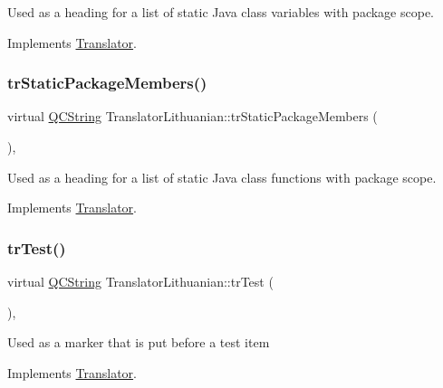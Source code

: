 Used as a heading for a list of static Java class variables with package scope. 

Implements \mbox{\hyperlink{class_translator}{Translator}}.

\mbox{\label{class_translator_lithuanian_ae675f44a1f3fa26421fdc69745eea950}} 
\subsubsection{\texorpdfstring{trStaticPackageMembers()}{trStaticPackageMembers()}}
{\footnotesize\ttfamily virtual \mbox{\hyperlink{class_q_c_string}{Q\+C\+String}} Translator\+Lithuanian\+::tr\+Static\+Package\+Members (\begin{DoxyParamCaption}{ }\end{DoxyParamCaption})\hspace{0.3cm}{\ttfamily [inline]}, {\ttfamily [virtual]}}

Used as a heading for a list of static Java class functions with package scope. 

Implements \mbox{\hyperlink{class_translator}{Translator}}.

\mbox{\label{class_translator_lithuanian_a4aedaa60971e8baffcbae5a48a36c8f0}} 
\subsubsection{\texorpdfstring{trTest()}{trTest()}}
{\footnotesize\ttfamily virtual \mbox{\hyperlink{class_q_c_string}{Q\+C\+String}} Translator\+Lithuanian\+::tr\+Test (\begin{DoxyParamCaption}{ }\end{DoxyParamCaption})\hspace{0.3cm}{\ttfamily [inline]}, {\ttfamily [virtual]}}

Used as a marker that is put before a test item 

Implements \mbox{\hyperlink{class_translator}{Translator}}.

\mbox{\label{class_translator_lithuanian_ae8ad7c31ec8cf2b21ba9c34f365f6fbe}} 
